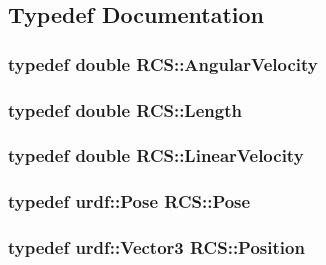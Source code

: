 \subsection{Typedef Documentation}
\hypertarget{namespaceRCS_a3ca212cf7a0c547f5496352e850372a9}{
\subsubsection[{Angular\-Velocity}]{\setlength{\rightskip}{0pt plus 5cm}typedef double {\bf R\-C\-S\-::\-Angular\-Velocity}}}\label{namespaceRCS_a3ca212cf7a0c547f5496352e850372a9}
\hypertarget{namespaceRCS_a86ac9427c1a3f2ec2b94a74888b2cefd}{
\subsubsection[{Length}]{\setlength{\rightskip}{0pt plus 5cm}typedef double {\bf R\-C\-S\-::\-Length}}}\label{namespaceRCS_a86ac9427c1a3f2ec2b94a74888b2cefd}
\hypertarget{namespaceRCS_a20e104cd075c4ca08a073a6261a70a84}{
\subsubsection[{Linear\-Velocity}]{\setlength{\rightskip}{0pt plus 5cm}typedef double {\bf R\-C\-S\-::\-Linear\-Velocity}}}\label{namespaceRCS_a20e104cd075c4ca08a073a6261a70a84}
\hypertarget{namespaceRCS_aac02c0fd845140ea93a2a9254b1db6f6}{
\subsubsection[{Pose}]{\setlength{\rightskip}{0pt plus 5cm}typedef urdf\-::\-Pose {\bf R\-C\-S\-::\-Pose}}}\label{namespaceRCS_aac02c0fd845140ea93a2a9254b1db6f6}
\hypertarget{namespaceRCS_afde073114b0dbe5587b2ec83fad48085}{
\subsubsection[{Position}]{\setlength{\rightskip}{0pt plus 5cm}typedef urdf\-::\-Vector3 {\bf R\-C\-S\-::\-Position}}}\label{namespaceRCS_afde073114b0dbe5587b2ec83fad48085}
